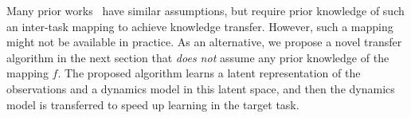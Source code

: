 Many prior works~\citep{mann2013directed,brys2015policy} have similar assumptions, but require prior knowledge of such an inter-task mapping to achieve knowledge transfer. However, such a mapping might not be available in practice. 
As an alternative, we propose a novel transfer algorithm in the next section that \textit{does not} assume any prior knowledge of the mapping $f$. The proposed algorithm learns a latent representation of the observations and a dynamics model in this latent space, and then the dynamics model is transferred to speed up learning in the target task. 


